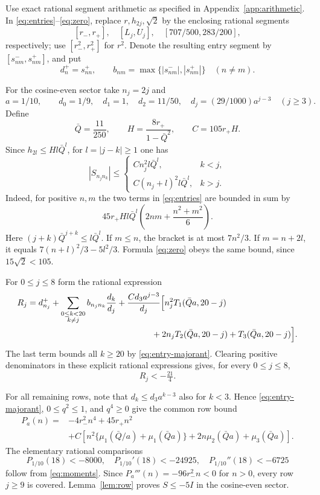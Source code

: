 \documentclass[a4paper,11pt]{article}
\numberwithin{equation}{section}
\theoremstyle{definition}
\theoremstyle{remark}
\begin{document}
Use exact rational segment arithmetic as specified in Appendix~\ref{app:arithmetic}. In \eqref{eq:entries}--\eqref{eq:zero}, replace $r,h_{2j},\sqrt2$ by the enclosing rational segments
\[
 [r_-,r_+],\quad[L_j,U_j],\quad[707/500,283/200],
\]
respectively; use $[r_-^2,r_+^2]$ for $r^2$. Denote the resulting entry segment by $[s^-_{nm},s^+_{nm}]$, and put
\[
 d^+_n=s^+_{nn},\qquad b_{nm}=\max\{|s^-_{nm}|,|s^+_{nm}|\}\quad(n\ne m).
\]

For the cosine-even sector take $n_j=2j$ and
\[
 a=1/10,\qquad d_0=1/9,\quad d_1=1,\quad d_2=11/50,\quad
 d_j=(29/1000)a^{j-3}\quad(j\ge3).
\]
Define
\begin{equation}\label{eq:constants}
 \bar Q=\frac{11}{250},\qquad H=\frac{8r_+}{1-\bar Q^2},\qquad C=105r_+H.
\end{equation}
Since $h_{2l}\le Hl\bar Q^l$, for $l=|j-k|\ge1$ one has
\begin{equation}\label{eq:entry-majorant}
 |S_{n_jn_k}|\le
 \begin{cases}C n_j^2l\bar Q^l,&k<j,\\
 C(n_j+l)^2l\bar Q^l,&k>j.
 \end{cases}
\end{equation}
Indeed, for positive $n,m$ the two terms in \eqref{eq:entries} are bounded in sum by
\[
 45r_+Hl\bar Q^l\left(2nm+\frac{n^2+m^2}{6}\right).
\]
Here $(j+k)\bar Q^{j+k}\le l\bar Q^l$. If $m\le n$, the bracket is at most $7n^2/3$. If $m=n+2l$, it equals $7(n+l)^2/3-5l^2/3$. Formula \eqref{eq:zero} obeys the same bound, since $15\sqrt2<105$.

For $0\le j\le8$ form the rational expression
\begin{align}
 R_j={}&d^+_{n_j}+\sum_{\substack{0\le k<20\\k\ne j}}b_{n_jn_k}\frac{d_k}{d_j}
 +\frac{Cd_3a^{j-3}}{d_j}\Big[
 n_j^2T_1(\bar Qa,20-j)\nonumber\\
 &\hspace{47mm}+2n_jT_2(\bar Qa,20-j)+T_3(\bar Qa,20-j)\Big].\label{eq:finite-rational-row}
\end{align}
The last term bounds all $k\ge20$ by \eqref{eq:entry-majorant}. Clearing positive denominators in these explicit rational expressions gives, for every $0\le j\le8$,
\begin{equation}\label{eq:single-uniform}
 R_j<-\tfrac{21}{4}.
\end{equation}

For all remaining rows, note that $d_k\le d_3a^{k-3}$ also for $k<3$. Hence \eqref{eq:entry-majorant}, $0\le q^2\le1$, and $q^4\ge0$ give the common row bound
\begin{align}
 P_a(n)={}&-4r_-^2n^4+45r_+n^2\nonumber\\
 &+C\left[n^2\{\mu_1(\bar Q/a)+\mu_1(\bar Qa)\}
 +2n\mu_2(\bar Qa)+\mu_3(\bar Qa)\right].\label{eq:tail-P}
\end{align}
The elementary rational comparisons
\[
 P_{1/10}(18)<-8000,\quad P_{1/10}'(18)<-24925,\quad
 P_{1/10}''(18)<-6725
\]
follow from \eqref{eq:moments}. Since $P_a'''(n)=-96r_-^2n<0$ for $n>0$, every row $j\ge9$ is covered. Lemma~\ref{lem:row} proves $S\le-5I$ in the cosine-even sector.
\end{document}

